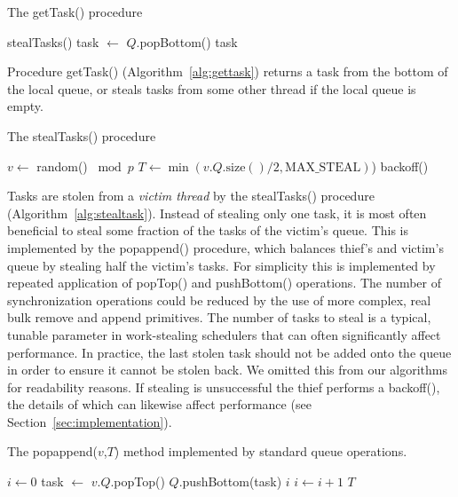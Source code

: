 \documentclass[preprint]{sigplanconf}
\begin{document}
\begin{algorithm}
\begin{algorithmic}[1]
\caption{The getTask() procedure}\label{alg:gettask}
\REPEAT
{}
	\STATE stealTasks()
\ENDIF
        \STATE task $\gets$ $Q$.popBottom()
\RETURN task
\end{algorithmic}
\end{algorithm}

Procedure getTask() (Algorithm~\ref{alg:gettask}) returns a task from the 
bottom of the local queue, or steals tasks from some other thread if the local
queue is empty.

\begin{algorithm}
\begin{algorithmic}[1]
\caption{The stealTasks() procedure}\label{alg:stealtask}
\STATE $v \gets$ random() $\bmod p$
\STATE $T\gets \min(v.Q.\mbox{size}()/2,\mbox{MAX\_STEAL})$)
	\STATE {}
	\RETURN
\ENDIF
\STATE{}
\STATE backoff()
\end{algorithmic}
\end{algorithm}

Tasks are stolen from a \emph{victim thread} by the stealTasks()
procedure (Algorithm~\ref{alg:stealtask}).  Instead of stealing only
one task, it is most often beneficial to steal some fraction of the
tasks of the victim's queue. This is implemented by the popappend()
procedure, which balances thief's and victim's queue by stealing half
the victim's tasks. For simplicity this is implemented by repeated
application of popTop() and pushBottom() operations. The number of
synchronization operations could be reduced by the use of more
complex, real bulk remove and append primitives. The number of tasks
to steal is a typical, tunable parameter in work-stealing schedulers
that can often significantly affect performance. In practice, the last
stolen task should not be added onto the queue in order to ensure it
cannot be stolen back. We omitted this from our algorithms for
readability reasons.  If stealing is unsuccessful the thief performs a
backoff(), the details of which can likewise affect performance (see
Section~\ref{sec:implementation}).

\begin{algorithm}
\caption{The popappend($v$,$T$) method implemented by standard queue 
operations.}\label{alg:popappend}
\begin{algorithmic}[1]
\STATE $i\gets 0$
	\STATE task $\gets$ $v.Q$.popTop()
		\STATE $Q$.pushBottom(task)
	\ELSE
		\RETURN $i$
	\ENDIF
\STATE $i\gets i+1$
\ENDWHILE
\RETURN $T$
\end{algorithmic}
\end{algorithm}
\end{document}
